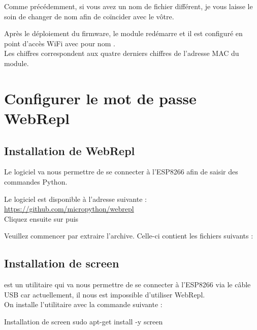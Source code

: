 {Comme précédemment, si vous avez un nom de fichier différent, je vous laisse le soin de changer de nom afin de coïncider avec le vôtre.


Après le déploiement du firmware, le module redémarre et il est configuré en point d’accès WiFi avec pour nom . \\ Les chiffres correspondent aux quatre derniers chiffres de l'adresse MAC du module. 


\section{Configurer le mot de passe WebRepl}

\subsection{Installation de WebRepl}

Le logiciel  va nous permettre de se connecter à l'ESP8266 afin de saisir des commandes Python.

Le logiciel est disponible à l'adresse suivante : \\

\url{https://github.com/micropython/webrepl}\\

Cliquez ensuite sur  puis 


Veuillez commencer par extraire l'archive.
Celle-ci contient les fichiers suivants : 


\subsection{Installation de screen}

 est un utilitaire qui va nous permettre de se connecter à l'ESP8266 via le câble USB car actuellement, il nous est impossible d'utiliser WebRepl.\\
On installe l'utilitaire avec la commande suivante : 
\begin{Bash}{Installation de screen}
sudo apt-get install -y screen
\end{Bash}

}
